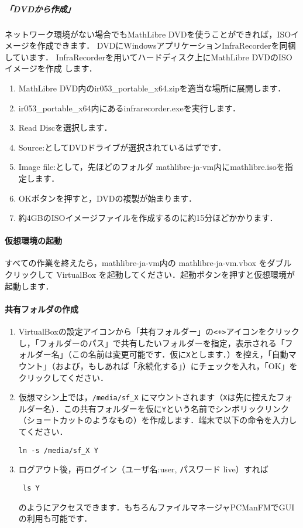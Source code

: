 \documentclass[a4,twocolumn]{jsarticle}
\newcommand{\ir}{ir053\_portable\_x64}
\newcommand{\vm}{mathlibre-ja-vm}
\begin{document}
\subparagraph{「DVDから作成」}
ネットワーク環境がない場合でもMathLibre DVDを使うことができれば，ISOイメージを作成できます．
DVDにWindowsアプリケーションInfraRecorderを同梱しています．
InfraRecorderを用いてハードディスク上にMathLibre DVDのISOイメージを作成
します．
\begin{enumerate}
 \item MathLibre DVD内の\ir.zipを適当な場所に展開します．
 \item \ir 内にあるinfrarecorder.exeを実行します．
 \item Read Discを選択します．
 \item Source:としてDVDドライブが選択されているはずです．
 \item Image file:として，先ほどのフォルダ \vm 内にmathlibre.isoを指定します．
 \item OKボタンを押すと，DVDの複製が始まります．
 \item 約4GBのISOイメージファイルを作成するのに約15分ほどかかります．
\end{enumerate}

\paragraph{仮想環境の起動}
すべての作業を終えたら，\vm 内の \vm.vbox をダブルクリックして
VirtualBox を起動してください．起動ボタンを押すと仮想環境が起動します．

\paragraph{共有フォルダの作成}
\begin{enumerate}
 \item VirtualBoxの設定アイコンから「共有フォルダー」の\verb|<+>|アイコンをクリックし，「フォルダーのパス」で共有したいフォルダーを指定，表示される「フォルダー名」（この名前は変更可能です．仮に\verb|X|とします．）を控え，「自動マウント」（および，もしあれば「永続化する」）にチェックを入れ，「OK」をクリックしてください．
 \item 仮想マシン上では，\verb|/media/sf_X| にマウントされます（\verb|X|は先に控えたフォルダー名）．この共有フォルダーを仮に\verb|Y|という名前でシンボリックリンク（ショートカットのようなもの）を作成します．端末で以下の命令を入力してください．
\begin{lstlisting}
ln -s /media/sf_X Y
\end{lstlisting}
\item ログアウト後，再ログイン（ユーザ名:user, パスワード live）すれば
\begin{lstlisting}
 ls Y
\end{lstlisting}
のようにアクセスできます．もちろんファイルマネージャPCManFMでGUIの利用も可能です．
\end{enumerate}

\end{document}
